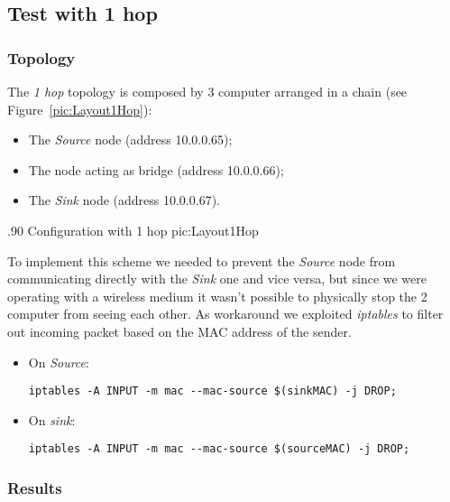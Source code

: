 \subsection{Test with 1 hop}

    \subsubsection{Topology}

        The \emph{1 hop} topology is composed by 3 computer arranged
        in a chain (see Figure~\ref{pic:Layout1Hop}):
        \begin{itemize}
        \item   The \emph{Source} node (address 10.0.0.65);
        \item   The node acting as bridge (address 10.0.0.66);
        \item   The \emph{Sink} node (address 10.0.0.67).
        \end{itemize}

                {.90\columnwidth}
                {Configuration with 1 hop}
                {pic:Layout1Hop}

        To implement this scheme we needed to prevent the \emph{Source}
        node from communicating directly with the \emph{Sink} one and vice
        versa, but since we were operating with a wireless medium it
        wasn't possible to physically stop the 2 computer from seeing each
        other. As workaround we exploited \emph{iptables} to filter out
        incoming packet based on the MAC address of the sender.

        \begin{itemize}
        \item On \emph{Source}:
            \begin{verbatim}
iptables -A INPUT -m mac --mac-source $(sinkMAC) -j DROP;
            \end{verbatim}

        \item On \emph{sink}:
            \begin{verbatim}
iptables -A INPUT -m mac --mac-source $(sourceMAC) -j DROP;
            \end{verbatim}

        \end{itemize}

    \subsubsection{Results}

